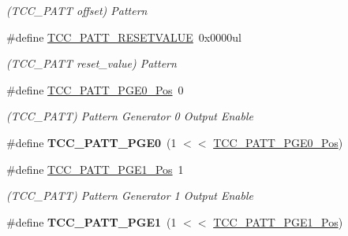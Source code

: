 \begin{DoxyCompactItemize}
\begin{DoxyCompactList}\small\item\em (T\+C\+C\+\_\+\+P\+A\+T\+T offset) Pattern \end{DoxyCompactList}\item 
\hypertarget{group___s_a_m_l21___t_c_c_gacc5dcc7f08b61090d2ef4ec595586f4d}{}\#define \hyperlink{group___s_a_m_l21___t_c_c_gacc5dcc7f08b61090d2ef4ec595586f4d}{T\+C\+C\+\_\+\+P\+A\+T\+T\+\_\+\+R\+E\+S\+E\+T\+V\+A\+L\+U\+E}~0x0000ul\label{group___s_a_m_l21___t_c_c_gacc5dcc7f08b61090d2ef4ec595586f4d}

\begin{DoxyCompactList}\small\item\em (T\+C\+C\+\_\+\+P\+A\+T\+T reset\+\_\+value) Pattern \end{DoxyCompactList}\item 
\hypertarget{group___s_a_m_l21___t_c_c_ga575030e941d2b3cfc1b4c8b14387b90d}{}\#define \hyperlink{group___s_a_m_l21___t_c_c_ga575030e941d2b3cfc1b4c8b14387b90d}{T\+C\+C\+\_\+\+P\+A\+T\+T\+\_\+\+P\+G\+E0\+\_\+\+Pos}~0\label{group___s_a_m_l21___t_c_c_ga575030e941d2b3cfc1b4c8b14387b90d}

\begin{DoxyCompactList}\small\item\em (T\+C\+C\+\_\+\+P\+A\+T\+T) Pattern Generator 0 Output Enable \end{DoxyCompactList}\item 
\hypertarget{group___s_a_m_l21___t_c_c_ga5c8587715cae1fd3495e2890db2c1dd3}{}\#define {\bfseries T\+C\+C\+\_\+\+P\+A\+T\+T\+\_\+\+P\+G\+E0}~(1 $<$$<$ \hyperlink{group___s_a_m_l21___t_c_c_ga575030e941d2b3cfc1b4c8b14387b90d}{T\+C\+C\+\_\+\+P\+A\+T\+T\+\_\+\+P\+G\+E0\+\_\+\+Pos})\label{group___s_a_m_l21___t_c_c_ga5c8587715cae1fd3495e2890db2c1dd3}

\item 
\hypertarget{group___s_a_m_l21___t_c_c_gafecc309bd002d88b539cd38dab696ba3}{}\#define \hyperlink{group___s_a_m_l21___t_c_c_gafecc309bd002d88b539cd38dab696ba3}{T\+C\+C\+\_\+\+P\+A\+T\+T\+\_\+\+P\+G\+E1\+\_\+\+Pos}~1\label{group___s_a_m_l21___t_c_c_gafecc309bd002d88b539cd38dab696ba3}

\begin{DoxyCompactList}\small\item\em (T\+C\+C\+\_\+\+P\+A\+T\+T) Pattern Generator 1 Output Enable \end{DoxyCompactList}\item 
\hypertarget{group___s_a_m_l21___t_c_c_ga9b80f7908a1cd6bd95ee8fd9acf6e7ac}{}\#define {\bfseries T\+C\+C\+\_\+\+P\+A\+T\+T\+\_\+\+P\+G\+E1}~(1 $<$$<$ \hyperlink{group___s_a_m_l21___t_c_c_gafecc309bd002d88b539cd38dab696ba3}{T\+C\+C\+\_\+\+P\+A\+T\+T\+\_\+\+P\+G\+E1\+\_\+\+Pos})\label{group___s_a_m_l21___t_c_c_ga9b80f7908a1cd6bd95ee8fd9acf6e7ac}


\end{DoxyCompactItemize}
